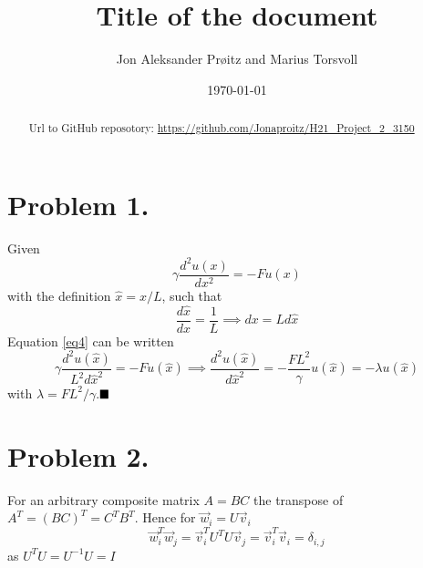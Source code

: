 \documentclass[english,notitlepage]{revtex4-1}  %
\begin{document}
\title{Title of the document}      %
\author{Jon Aleksander Prøitz and Marius Torsvoll}          %
\date{\today}                             %
\noaffiliation                            %

\begin{abstract}
    Url to GitHub reposotory: \url{https://github.com/Jonaproitz/H21_Project_2_3150}
\end{abstract}
\maketitle 
    

\section*{Problem 1.}
    Given
    \begin{equation}
            \gamma \frac{d^2 u(x)}{d x^2}
        =   -Fu(x)
        \label{eq4}
    \end{equation}
    with the definition $\hat{x} = x/L$, such that
    \begin{equation*}
            \frac{d\hat{x}}{d x}
        =   \frac{1}{L}
        \implies 
            dx
        =   L d\hat{x}
    \end{equation*}
    Equation \ref{eq4} can be written
    \begin{equation*}
            \gamma \frac{d^2 u(\hat{x})}{L^2 d\hat{x}^2}
        =   -Fu(\hat{x})
        \implies
            \frac{d^2 u(\hat{x})}{d \hat{x}^2}
        =   -\frac{FL^2}{\gamma}u(\hat{x})
        =   -\lambda u(\hat{x})
    \end{equation*}
    with $\lambda = FL^2/\gamma$.$\hfill\blacksquare$


\section*{Problem 2.}
    For an arbitrary composite matrix $A = BC$ the transpose of $A^T = (BC)^T = C^TB^T$.
    Hence for $\vec{w}_i = U\vec{v}_i$
    \begin{equation*}
            \vec{w}^T_i\vec{w}_j
        =   \vec{v}^T_iU^TU\vec{v}_j
        =   \vec{v}^T_i\vec{v}_i
        =   \delta_{i,j}
    \end{equation*}
    as $U^TU = U^{-1}U = I$
\end{document}
